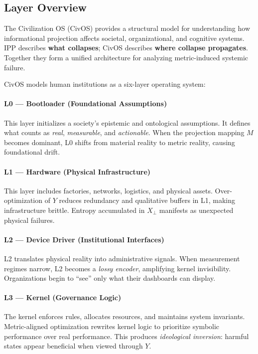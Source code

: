 \documentclass[11pt]{article}
\begin{document}
\subsection{Layer Overview}

The Civilization OS (CivOS) provides a structural model for understanding how informational projection affects societal, organizational, and cognitive systems.
IPP describes \textbf{what collapses}; CivOS describes \textbf{where collapse propagates}.
Together they form a unified architecture for analyzing metric-induced systemic failure.

CivOS models human institutions as a six-layer operating system:

\paragraph{L0 --- Bootloader (Foundational Assumptions)}
This layer initializes a society's epistemic and ontological assumptions.
It defines what counts as \emph{real}, \emph{measurable}, and \emph{actionable}.
When the projection mapping $M$ becomes dominant, L0 shifts from material reality to metric reality, causing foundational drift.

\paragraph{L1 --- Hardware (Physical Infrastructure)}
This layer includes factories, networks, logistics, and physical assets.
Over-optimization of $Y$ reduces redundancy and qualitative buffers in L1, making infrastructure brittle.
Entropy accumulated in $X_{\perp}$ manifests as unexpected physical failures.

\paragraph{L2 --- Device Driver (Institutional Interfaces)}
L2 translates physical reality into administrative signals.
When measurement regimes narrow, L2 becomes a \emph{lossy encoder}, amplifying kernel invisibility.
Organizations begin to ``see'' only what their dashboards can display.

\paragraph{L3 --- Kernel (Governance Logic)}
The kernel enforces rules, allocates resources, and maintains system invariants.
Metric-aligned optimization rewrites kernel logic to prioritize symbolic performance over real performance.
This produces \emph{ideological inversion}: harmful states appear beneficial when viewed through $Y$.
\end{document}
